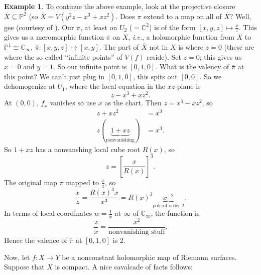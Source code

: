 \documentclass[12pt]{article}
\newcommand{\cx}{\mathbb{C}}
\newcommand{\p}{\mathbb{P}}
\newcommand{\ita}[1]{\textit{#1}}
\theoremstyle{definition}
\newtheorem{example}[theorem]{Example}
\theoremstyle{remark}
\begin{document}
\begin{example}
    To continue the above example, look at the projective closure $\overline{X} \subseteq \p^2$ (so $\overline{X} = V(y^2z - x^3 + xz^2)$. Does $\pi$ extend to a map on all of $\overline{X}$? Well, gee (courtesy of \cite{Valentini}). Our $\pi$, at least on $U_2$ ($=\cx^2$) is of the form $[x,y,z] \mapsto \frac{x}{z}$. This gives us a meromorphic function $\overline{\pi}$ on $X$, \ita{i.e.}, a holomorphic function from $\overline{X}$ to $\p^1 \cong \cx_{\infty}$, $\overline{\pi} : [x,y,z] \mapsto [x,y]$. The part of $\overline{X}$ not in $X$ is where $z = 0$ (these are where the so called ``infinite points'' of $V(f)$ reside). Set $z = 0$; this gives us $x = 0$ and $y = 1$. So our infinite point is $[0,1,0]$. What is the valency of $\overline{\pi}$ at this point? We can't just plug in $[0,1,0]$, this spits out $[0,0]$. So we dehomogenize at $U_1$, where the local equation in the $xz$-plane is 
    \begin{equation}
        z - x^3 + xz^2.
    \end{equation}
    At $(0,0)$, $f_x$ vanishes so use $x$ as the chart. Then $z = x^3 - xz^2$, so 
    \begin{equation}
        \begin{split}
            z + xz^2 & = x^3 \\
            z (\underbrace{1 + xz}_{\text{nonvanishing}}) & = x^3.
        \end{split}
    \end{equation}
    So $1 + xz$ has a nonvanshing local cube root $R(x)$, so 
    \begin{equation}
        z = \left[ \frac{x}{R(x)} \right]^3.
    \end{equation}
    The original map $\overline{\pi}$ mapped to $\frac{x}{z}$, so 
    \begin{equation}
        \frac{x}{z} = \frac{R(x)^3 x}{x^3} = R(x)^3 \underbrace{x^{-2}}_{\text{pole of order 2}}.
    \end{equation}
    In terms of local coordinates $w = \frac{1}{x}$ at $\infty$ of $\cx_{\infty}$, the function is 
    \begin{equation}
        \frac{z}{x} = \frac{x^2}{\text{nonvanishing stuff}}.
    \end{equation}
    Hence the valence of $\overline{\pi}$ at $[0,1,0]$ is 2.
\end{example}
Now, let $f : X \to Y$ be a nonconstant holomorphic map of Riemann surfaces. Suppose that $X$ is compact. A nice cavalcade of facts follows:
\end{document}

